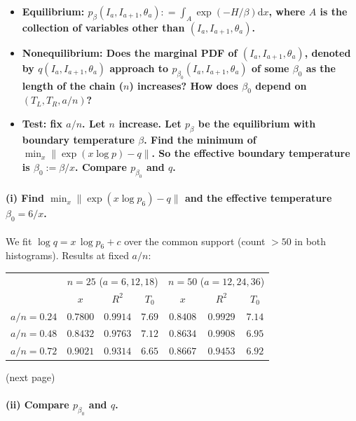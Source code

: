 \documentclass[11pt]{article}
\begin{document}
\begin{itemize}
    \item \textbf{Equilibrium: $p_\beta(I_a, I_{a+1}, \theta_a) : = \int_A \exp(-H/\beta) \mathrm{d}x$, where $A$ is the collection of variables other than $(I_a, I_{a+1}, \theta_a)$.}
    \item \textbf{Nonequilibrium: Does the marginal PDF of $(I_a, I_{a+1}, \theta_a)$, denoted by $q(I_a, I_{a+1}, \theta_a)$ approach to $p_{\beta_0}(I_a, I_{a+1}, \theta_a)$ of some $\beta_0$ as the length of the chain ($n$) increases? How does $\beta_0$ depend on $(T_L, T_R, a/n)$? }
    \item \textbf{Test: fix $a/n$. Let $n$ increase. Let $p_\beta$ be the equilibrium with boundary temperature $\beta$. Find the minimum of $\min_x\|\exp(x\log p) - q\|$. So the effective boundary temperature is $\beta_0:= \beta/x$. Compare $p_{\beta_0}$ and $q$.}
\end{itemize}






\paragraph{(i) Find $\min_x \|\exp(x\log p_6) - q\|$ and the effective temperature
$\beta_0 = 6/x$.}



We fit $\log q = x\,\log p_6 + c$ over the common support (count $>50$ in
both histograms). Results at fixed $a/n$:
\begin{center}
\begin{tabular}{lcccccc}
\toprule
 & \multicolumn{3}{c}{$n=25$ ($a=6,12,18$)} & \multicolumn{3}{c}{$n=50$ ($a=12,24,36$)} \\
 & $x$ & $R^2$ & $T_0$ & $x$ & $R^2$ & $T_0$ \\
\midrule
$a/n=0.24$ & $0.7800$ & $0.9914$ & $7.69$ & $0.8408$ & $0.9929$ & $7.14$ \\
$a/n=0.48$ & $0.8432$ & $0.9763$ & $7.12$ & $0.8634$ & $0.9908$ & $6.95$ \\
$a/n=0.72$ & $0.9021$ & $0.9314$ & $6.65$ & $0.8667$ & $0.9453$ & $6.92$ \\
\bottomrule
\end{tabular}
\end{center}

(next page)

\newpage
\paragraph{(ii) Compare $p_{\beta_0}$ and $q$.}
\end{document}
